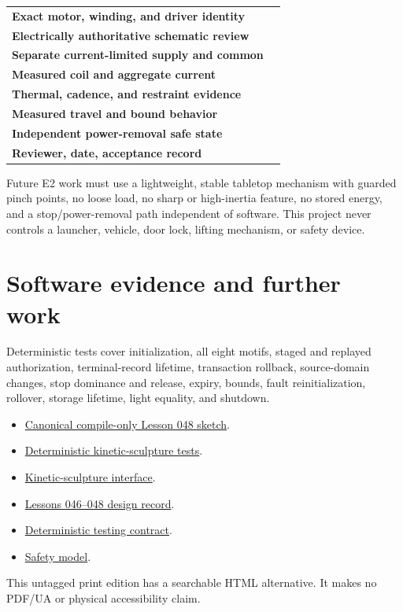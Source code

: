 \documentclass[10pt]{article}
\begin{document}
\begin{tabularx}{\linewidth}{@{}>{\bfseries}l X@{}}
Exact motor, winding, and driver identity & \rule{0pt}{16pt}\hrulefill\\[9pt]
Electrically authoritative schematic review & \hrulefill\\[9pt]
Separate current-limited supply and common & \hrulefill\\[9pt]
Measured coil and aggregate current & \hrulefill\\[9pt]
Thermal, cadence, and restraint evidence & \hrulefill\\[9pt]
Measured travel and bound behavior & \hrulefill\\[9pt]
Independent power-removal safe state & \hrulefill\\[9pt]
Reviewer, date, acceptance record & \hrulefill\\
\end{tabularx}

Future E2 work must use a lightweight, stable tabletop mechanism with guarded
pinch points, no loose load, no sharp or high-inertia feature, no stored
energy, and a stop/power-removal path independent of software. This project
never controls a launcher, vehicle, door lock, lifting mechanism, or safety
device.

\section{Software evidence and further work}
Deterministic tests cover initialization, all eight motifs, staged and replayed
authorization, terminal-record lifetime, transaction rollback, source-domain
changes, stop dominance and release, expiry, bounds, fault reinitialization, rollover,
storage lifetime, light equality, and shutdown.

\begin{itemize}
 \item \href{https://github.com/spincyc/adk/blob/main/examples/Lesson048KineticLightSculpture/Lesson048KineticLightSculpture.ino}
       {Canonical compile-only Lesson 048 sketch}.
 \item \href{https://github.com/spincyc/adk/blob/main/tests/test_kinetic_sculpture.cpp}
       {Deterministic kinetic-sculpture tests}.
 \item \href{https://github.com/spincyc/adk/blob/main/src/kinetic_sculpture.h}
       {Kinetic-sculpture interface}.
 \item \href{https://github.com/spincyc/adk/blob/main/docs/design/LESSONS_046_048_KINETIC_SCULPTURE_PLAN.md}
       {Lessons 046--048 design record}.
 \item \href{https://github.com/spincyc/adk/blob/main/docs/TESTING.md}
       {Deterministic testing contract}.
 \item \href{https://github.com/spincyc/adk/blob/main/docs/SAFETY_MODEL.md}
       {Safety model}.
\end{itemize}

This untagged print edition has a searchable HTML alternative.
It makes no PDF/UA or physical accessibility claim.
\end{document}

